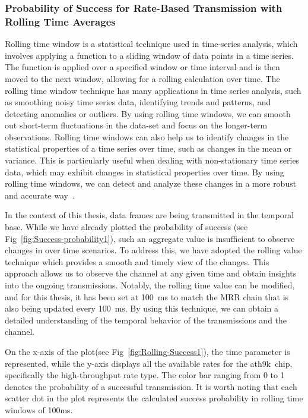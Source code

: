 \newpage

\subsubsection{Probability of Success for Rate-Based Transmission with Rolling Time Averages}
\label{rolling-success}
Rolling time window is a statistical technique used in time-series analysis, which involves applying a function to a sliding window of data points in a time series. The function is applied over a specified window or time interval and is then moved to the next window, allowing for a rolling calculation over time. The rolling time window technique has many applications in time series analysis, such as smoothing noisy time series data, identifying trends and patterns, and detecting anomalies or outliers. By using rolling time windows, we can smooth out short-term fluctuations in the data-set and focus on the longer-term observations. Rolling time windows can also help us to identify changes in the statistical properties of a time series over time, such as changes in the mean or variance. This is particularly useful when dealing with non-stationary time series data, which may exhibit changes in statistical properties over time. By using rolling time windows, we can detect and analyze these changes in a more robust and accurate way~\cite{pandas_rolling}.

In the context of this thesis, data frames are being transmitted in the temporal base. While we have already plotted the probability of success (see Fig~\ref{fig:Success-probability1}), such an aggregate value is insufficient to observe changes in over time scenarios. To address this, we have adopted the rolling value technique which provides a smooth and timely view of the changes. This approach allows us to observe the channel at any given time and obtain insights into the ongoing transmissions. Notably, the rolling time value can be modified, and for this thesis, it has been set at 100~ms to match the MRR chain that is also being updated every 100~ms. By using this technique, we can obtain a detailed understanding of the temporal behavior of the transmissions and the channel.

On the x-axis of the plot(see Fig~\ref{fig:Rolling-Success1}), the time parameter is represented, while the y-axis displays all the available rates for the ath9k~chip, specifically the high-throughput rate type. The color bar ranging from 0 to 1 denotes the probability of a successful transmission. It is worth noting that each scatter dot in the plot represents the calculated success probability in rolling time windows of 100ms.
\newpage
